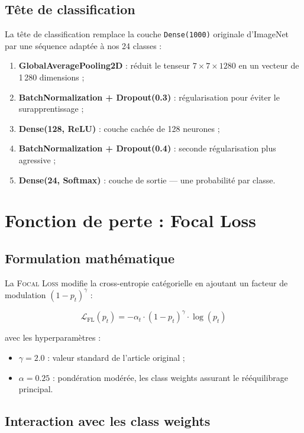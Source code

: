\documentclass[12pt, a4paper, twoside]{report}
\newcommand{\focal}{\textsc{Focal Loss}}
\begin{document}
\subsection{Tête de classification}

La tête de classification remplace la couche \texttt{Dense(1000)} originale d'ImageNet par une séquence adaptée à nos 24 classes :

\begin{enumerate}
    \item \textbf{GlobalAveragePooling2D} : réduit le tenseur $7 \times 7 \times 1280$ en un vecteur de 1\,280 dimensions ;
    \item \textbf{BatchNormalization + Dropout(0.3)} : régularisation pour éviter le surapprentissage ;
    \item \textbf{Dense(128, ReLU)} : couche cachée de 128 neurones ;
    \item \textbf{BatchNormalization + Dropout(0.4)} : seconde régularisation plus agressive ;
    \item \textbf{Dense(24, Softmax)} : couche de sortie — une probabilité par classe.
\end{enumerate}

\section{Fonction de perte : Focal Loss}

\subsection{Formulation mathématique}

La \focal{} modifie la cross-entropie catégorielle en ajoutant un facteur de modulation $(1 - p_t)^\gamma$ :

\begin{equation}
\mathcal{L}_{\text{FL}}(p_t) = -\alpha_t \cdot (1 - p_t)^{\gamma} \cdot \log(p_t)
\end{equation}

avec les hyperparamètres :
\begin{itemize}
    \item $\gamma = 2.0$ : valeur standard de l'article original \cite{lin2017focal} ;
    \item $\alpha = 0.25$ : pondération modérée, les class weights assurant le rééquilibrage principal.
\end{itemize}

\subsection{Interaction avec les class weights}
\end{document}
